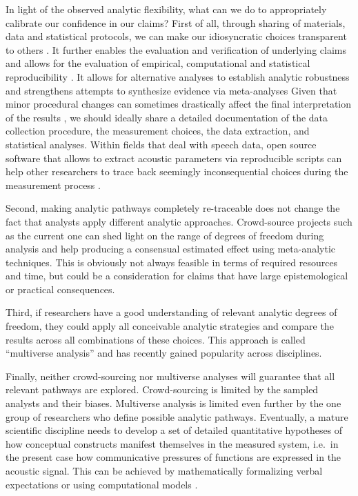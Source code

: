 \documentclass[Review,times,sageh]{sagej}
\begin{document}
In light of the observed analytic flexibility, what can we do to appropriately calibrate our confidence in our claims?
First of all, through sharing of materials, data and statistical protocols, we can make our idiosyncratic choices transparent to others \citep{munafo2017manifesto, vazire2017quality}.
It further enables the evaluation and verification of underlying claims and allows for the evaluation of empirical, computational and statistical reproducibility \citep{lebel2018unified}.
It allows for alternative analyses to establish analytic robustness \citep{steegen2016increasing} and strengthens attempts to synthesize evidence via meta-analyses \citep[e.g.,][]{nicenboim2018using}
Given that minor procedural changes can sometimes drastically affect the final interpretation of the results \citep{breznau2021observing}, we should ideally share a detailed documentation of the data collection procedure, the measurement choices, the data extraction, and statistical analyses.
Within fields that deal with speech data, open source software that allows to extract acoustic parameters via reproducible scripts can help other researchers to trace back seemingly inconsequential choices during the measurement process \citep[e.g., Praat:][EMU: \citet{winkelmann2017emu}]{boersma2021praat}.

Second, making analytic pathways completely re-traceable does not change the fact that analysts apply different analytic approaches.
Crowd-source projects such as the current one can shed light on the range of degrees of freedom during analysis and help producing a consensual estimated effect using meta-analytic techniques.
This is obviously not always feasible in terms of required resources and time, but could be a consideration for claims that have large epistemological or practical consequences.

Third, if researchers have a good understanding of relevant analytic degrees of freedom, they could apply all conceivable analytic strategies and compare the results across all combinations of these choices.
This approach is called ``multiverse analysis'' \citep[e.g,][]{steegen2016increasing, harder2020multiverse} and has recently gained popularity across disciplines.

Finally, neither crowd-sourcing nor multiverse analyses will guarantee that all relevant pathways are explored.
Crowd-sourcing is limited by the sampled analysts and their biases.
Multiverse analysis is limited even further by the one group of researchers who define possible analytic pathways.
Eventually, a mature scientific discipline needs to develop a set of detailed quantitative hypotheses of how conceptual constructs manifest themselves in the measured system, i.e.~in the present case how communicative pressures of functions are expressed in the acoustic signal.
This can be achieved by mathematically formalizing verbal expectations or using computational models \citep[e.g.,][]{van2020formalizing, guest2021computational, scheel2021hypothesis, devezer2021case}.
\end{document}
